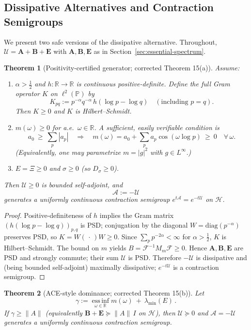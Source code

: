 \documentclass[10pt]{article}
\newtheorem{theorem}{Theorem}
\begin{document}
\subsection{Dissipative Alternatives and Contraction Semigroups}\label{sec:dissipative}

We present two safe versions of the dissipative alternative. Throughout,
\(\mathcal U=\mathbf A+\mathbf B+\mathbf E\) with \(\mathbf A,\mathbf B,\mathbf E\) as in Section~\ref{sec:essential-spectrum}.

\begin{theorem}[Positivity-certified generator; corrected Theorem 15(a)]\label{thm:15a}
Assume:
\begin{enumerate}
\item \(\alpha>\frac12\) and \(h:\mathbb R\to\mathbb R\) is continuous positive-definite.
Define the full Gram operator \(K\) on \(\ell^2(\mathbb P)\) by
\[
K_{pq}:=p^{-\alpha}q^{-\alpha}\,h(\log p-\log q)\quad(\text{including }p=q).
\]
Then \(K\ge 0\) and \(K\) is Hilbert–Schmidt.
\item \(m(\omega)\ge 0\) for a.e.\ \(\omega\in\mathbb R\).
A sufficient, easily verifiable condition is
\[
a_0 \ \ge\ \sum_{p}|a_p|
\quad\Longrightarrow\quad
m(\omega)=a_0+\sum_p a_p\cos(\omega\log p)\ \ge\ 0\quad\forall\,\omega.
\]
(Equivalently, one may parametrize \(m=|g|^2\) with \(g\in L^\infty\).)
\item \(E=\Xi\ge 0\) and \(\sigma\ge 0\) (so \(D_\sigma\ge 0\)).
\end{enumerate}
Then \(\mathcal U\ge 0\) is bounded self-adjoint, and
\[
\mathcal A:=-\mathcal U
\]
generates a uniformly continuous contraction semigroup \(e^{t\mathcal A}=e^{-t\mathcal U}\) on \(\mathcal H\).
\end{theorem}

\begin{proof}
Positive-definiteness of \(h\) implies the Gram matrix \((h(\log p-\log q))_{p,q}\) is PSD; conjugation by the diagonal \(W=\mathrm{diag}(p^{-\alpha})\) preserves PSD, so \(K=W(\,\cdot\,)W\ge 0\).
Since \(\sum_p p^{-2\alpha}<\infty\) for \(\alpha>\frac12\), \(K\) is Hilbert–Schmidt.
The bound on \(m\) yields \(B=\mathcal F^{-1}M_m\mathcal F\ge 0\).
Hence \(\mathbf A,\mathbf B,\mathbf E\) are PSD and strongly commute; their sum \(\mathcal U\) is PSD.
Therefore \(-\mathcal U\) is dissipative and (being bounded self-adjoint) maximally dissipative; \(e^{-t\mathcal U}\) is a contraction semigroup.
\end{proof}

\begin{theorem}[ACE-style dominance; corrected Theorem 15(b)]\label{thm:15b}
Let
\[
\gamma := \operatorname*{ess\,inf}_{\omega\in\mathbb R} m(\omega)\ +\ \lambda_{\min}(E)\,.
\]
If \(\gamma \ge \|A\|\) (equivalently \(\mathbf B+\mathbf E \succeq \|A\|\,I\) on \(\mathcal H\)),
then \(\mathcal U \succeq 0\) and \(\mathcal A=-\mathcal U\) generates a uniformly continuous contraction semigroup.
\end{theorem}
\end{document}
